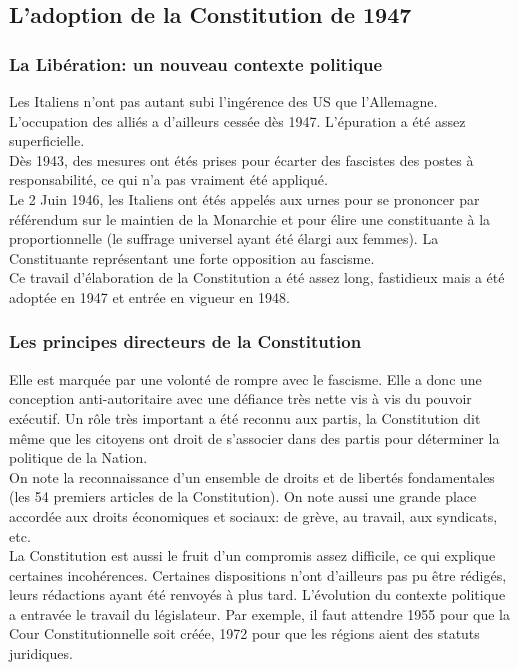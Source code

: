 \documentclass[10pt, a4paper, openany]{book}
\begin{document}
\subsection{L'adoption de la Constitution de 1947}

\subsubsection{La Libération: un nouveau contexte politique}

Les Italiens n'ont pas autant subi l'ingérence des US que l'Allemagne. L'occupation des alliés a d'ailleurs cessée dès 1947. L'épuration a été assez superficielle. \\
Dès 1943, des mesures ont étés prises pour écarter des fascistes des postes à responsabilité, ce qui n'a pas vraiment été appliqué. \\
Le 2 Juin 1946, les Italiens ont étés appelés aux urnes pour se prononcer par référendum sur le maintien de la Monarchie et pour élire une constituante à la proportionnelle (le suffrage universel ayant été élargi aux femmes). La Constituante représentant une forte opposition au fascisme. \\
Ce travail d'élaboration de la Constitution a été assez long, fastidieux mais a été adoptée en 1947 et entrée en vigueur en 1948. 

\subsubsection{Les principes directeurs de la Constitution}

Elle est marquée par une volonté de rompre avec le fascisme. Elle a donc une conception anti-autoritaire avec une défiance très nette vis à vis du pouvoir exécutif. Un rôle très important a été reconnu aux partis, la Constitution dit même que les citoyens ont droit de s'associer dans des partis pour déterminer la politique de la Nation. \\
On note la reconnaissance d'un ensemble de droits et de libertés fondamentales (les 54 premiers articles de la Constitution). On note aussi une grande place accordée aux droits économiques et sociaux: de grève, au travail, aux syndicats, etc. \\
La Constitution est aussi le fruit d'un compromis assez difficile, ce qui explique certaines incohérences. Certaines dispositions n'ont d'ailleurs pas pu être rédigés, leurs rédactions ayant été renvoyés à plus tard. L'évolution du contexte politique a entravée le travail du législateur. Par exemple, il faut attendre 1955 pour que la Cour Constitutionnelle soit créée, 1972 pour que les régions aient des statuts juridiques. 
\end{document}
